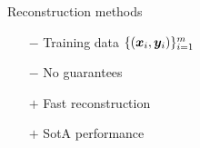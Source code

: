 \begin{frame}{Reconstruction methods}
{\begin{minipage}{0.48\linewidth}
        \end{minipage}
        \hfill
        \begin{minipage}{0.48\linewidth}
            \begin{itemize}
            \item[$-$] Training data $\{({\bm{x}}_i,{\bm{y}}_i)\}_{i=1}^m$\\
            \item[$-$] No guarantees 
            \item[$+$] Fast reconstruction\\
            \item[$+$] SotA performance\\
        \end{itemize}
        \end{minipage}}



    \end{frame}


    

        
        

